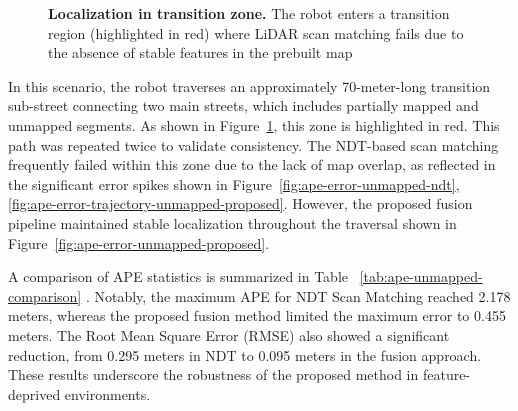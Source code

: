 \begin{figure}[H]
	\centering
	
	\caption[]%
	{\textbf{	Localization in transition zone.} The robot enters a transition region (highlighted in red) where LiDAR scan matching fails due to the absence of stable features in the prebuilt map
	}
	\label{fig:unmapped-zone}
\end{figure}

In this scenario, the robot traverses an approximately 70-meter-long transition sub-street connecting two main streets, which includes partially mapped and unmapped segments. As shown in Figure~\ref{fig:unmapped-zone}, this zone is highlighted in red. This path was repeated twice to validate consistency. The NDT-based scan matching frequently failed within this zone due to the lack of map overlap, as reflected in the significant error spikes shown in Figure~\ref{fig:ape-error-unmapped-ndt}, \ref{fig:ape-error-trajectory-unmapped-proposed}. However, the proposed fusion pipeline maintained stable localization throughout the traversal shown in Figure~\ref{fig:ape-error-unmapped-proposed}.

A comparison of APE statistics is summarized in Table ~\ref{tab:ape-unmapped-comparison} . Notably, the maximum APE for NDT Scan Matching reached 2.178 meters, whereas the proposed fusion method limited the maximum error to 0.455 meters. The Root Mean Square Error (RMSE) also showed a significant reduction, from 0.295 meters in NDT to 0.095 meters in the fusion approach. These results underscore the robustness of the proposed method in feature-deprived environments.


